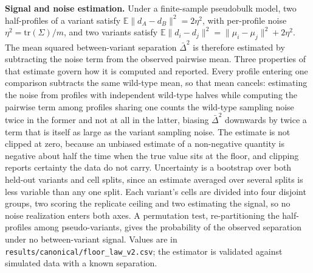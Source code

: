 \documentclass[11pt,letterpaper]{article}
\begin{document}
\textbf{Signal and noise estimation.} Under a finite-sample pseudobulk model, two half-profiles of a variant satisfy $\mathbb{E}\lVert d_A - d_B\rVert^2 = 2\eta^2$, with per-profile noise $\eta^2 = \mathrm{tr}(\Sigma)/m$, and two variants satisfy $\mathbb{E}\lVert d_i - d_j\rVert^2 = \lVert\mu_i-\mu_j\rVert^2 + 2\eta^2$. The mean squared between-variant separation $\bar{\Delta}^2$ is therefore estimated by subtracting the noise term from the observed pairwise mean. Three properties of that estimate govern how it is computed and reported. Every profile entering one comparison subtracts the same wild-type mean, so that mean cancels: estimating the noise from profiles with independent wild-type halves while computing the pairwise term among profiles sharing one counts the wild-type sampling noise twice in the former and not at all in the latter, biasing $\bar{\Delta}^2$ downwards by twice a term that is itself as large as the variant sampling noise. The estimate is not clipped at zero, because an unbiased estimate of a non-negative quantity is negative about half the time when the true value sits at the floor, and clipping reports certainty the data do not carry. Uncertainty is a bootstrap over both held-out variants and cell splits, since an estimate averaged over several splits is less variable than any one split. Each variant's cells are divided into four disjoint groups, two scoring the replicate ceiling and two estimating the signal, so no noise realization enters both axes. A permutation test, re-partitioning the half-profiles among pseudo-variants, gives the probability of the observed separation under no between-variant signal. Values are in \texttt{results/canonical/floor\_law\_v2.csv}; the estimator is validated against simulated data with a known separation.
\end{document}
